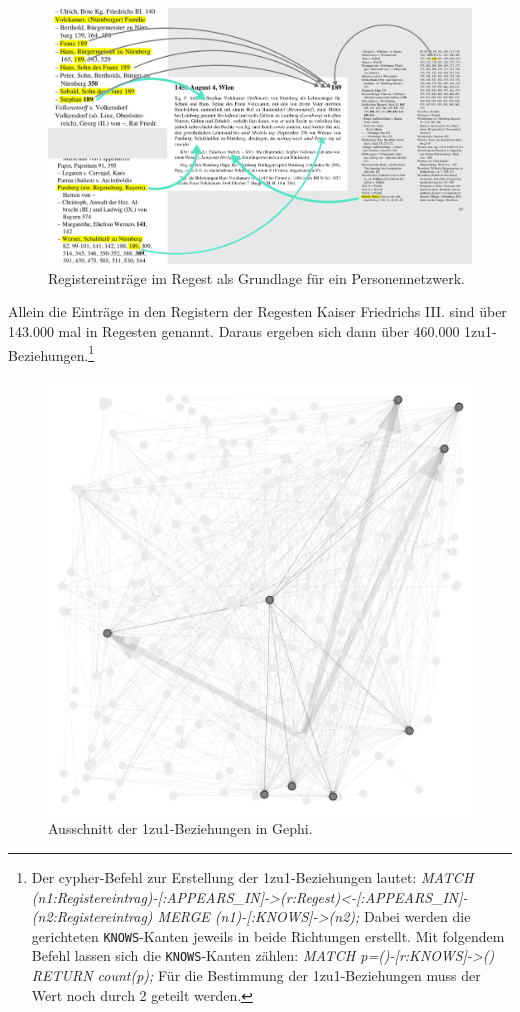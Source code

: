 \documentclass[ngerman,]{scrreprt}
\begin{document}
\begin{figure}
\centering
\includegraphics{Bilder/Register-und-Regest-19-189.png}
\caption{Registereinträge im Regest als Grundlage für ein Personennetzwerk.}
\end{figure}

Allein die Einträge in den Registern der Regesten Kaiser Friedrichs III. sind über 143.000 mal in Regesten genannt. Daraus ergeben sich dann über 460.000 1zu1-Beziehungen.\footnote{Der cypher-Befehl zur Erstellung der 1zu1-Beziehungen lautet: \emph{MATCH (n1:Registereintrag)-{[}:APPEARS\_IN{]}-\textgreater{}(r:Regest)\textless{}-{[}:APPEARS\_IN{]}-(n2:Registereintrag) MERGE (n1)-{[}:KNOWS{]}-\textgreater{}(n2);} Dabei werden die gerichteten \texttt{KNOWS}-Kanten jeweils in beide Richtungen erstellt. Mit folgendem Befehl lassen sich die \texttt{KNOWS}-Kanten zählen: \emph{MATCH p=()-{[}r:KNOWS{]}-\textgreater{}() RETURN count(p);} Für die Bestimmung der 1zu1-Beziehungen muss der Wert noch durch 2 geteilt werden.}

\begin{figure}
\centering
\includegraphics{Bilder/Gephi-Register.png}
\caption{Ausschnitt der 1zu1-Beziehungen in Gephi.}
\end{figure}
\end{document}
